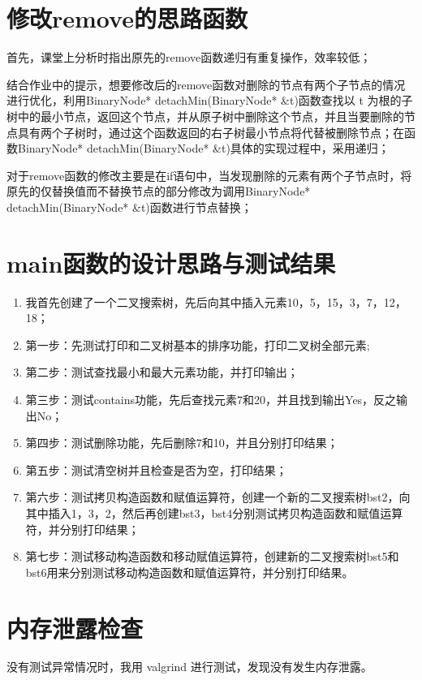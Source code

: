 \documentclass[UTF8]{ctexart}
\begin{document}
\pagestyle{fancy}
\fancyhead{}

\section{修改remove的思路函数}
首先，课堂上分析时指出原先的remove函数递归有重复操作，效率较低；

结合作业中的提示，想要修改后的remove函数对删除的节点有两个子节点的情况进行优化，利用BinaryNode* detachMin(BinaryNode* \&t)函数查找以 t 为根的子树中的最小节点，返回这个节点，并从原子树中删除这个节点，并且当要删除的节点具有两个子树时，通过这个函数返回的右子树最小节点将代替被删除节点；在函数BinaryNode* detachMin(BinaryNode* \&t)具体的实现过程中，采用递归；

对于remove函数的修改主要是在if语句中，当发现删除的元素有两个子节点时，将原先的仅替换值而不替换节点的部分修改为调用BinaryNode* detachMin(BinaryNode* \&t)函数进行节点替换；




\section{main函数的设计思路与测试结果}

\begin{enumerate}

    \item 我首先创建了一个二叉搜索树，先后向其中插入元素10，5，15，3，7，12，18；
    \item 第一步：先测试打印和二叉树基本的排序功能，打印二叉树全部元素;
    \item 第二步：测试查找最小和最大元素功能，并打印输出；
    \item 第三步：测试contains功能，先后查找元素7和20，并且找到输出Yes，反之输出No；  
    \item 第四步：测试删除功能，先后删除7和10，并且分别打印结果； 
    \item 第五步：测试清空树并且检查是否为空，打印结果；  
    \item 第六步：测试拷贝构造函数和赋值运算符，创建一个新的二叉搜索树bst2，向其中插入1，3，2，然后再创建bst3，bst4分别测试拷贝构造函数和赋值运算符，并分别打印结果；
    \item 第七步：测试移动构造函数和移动赋值运算符，创建新的二叉搜索树bst5和bst6用来分别测试移动构造函数和赋值运算符，并分别打印结果。

\end{enumerate}

\section{内存泄露检查}
没有测试异常情况时，我用 valgrind 进行测试，发现没有发生内存泄露。
\end{document}
